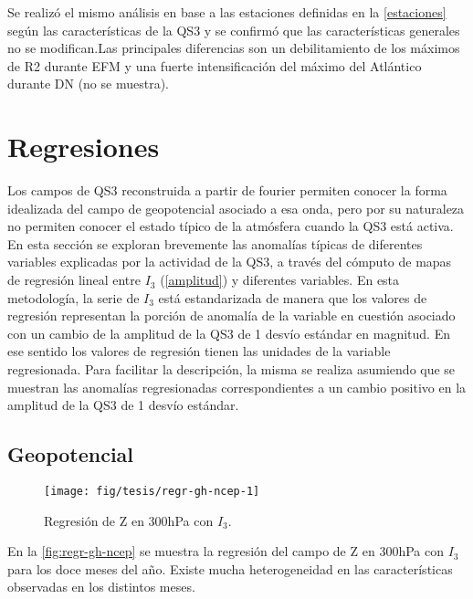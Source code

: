 \documentclass[spanish,a4paper,12p]{book}
\begin{document}
Se realizó el mismo análisis en base a las estaciones definidas en la
\autoref{estaciones} según las características de la QS3 y se confirmó
que las características generales no se modifican.Las principales
diferencias son un debilitamiento de los máximos de R2 durante EFM y una
fuerte intensificación del máximo del Atlántico durante DN (no se
muestra).

\section{Regresiones}\label{regresiones}

Los campos de QS3 reconstruida a partir de fourier permiten conocer la
forma idealizada del campo de geopotencial asociado a esa onda, pero por
su naturaleza no permiten conocer el estado típico de la atmósfera
cuando la QS3 está activa. En esta sección se exploran brevemente las
anomalías típicas de diferentes variables explicadas por la actividad de
la QS3, a través del cómputo de mapas de regresión lineal entre \(I_3\)
(\autoref{amplitud}) y diferentes variables. En esta metodología, la
serie de \(I_3\) está estandarizada de manera que los valores de
regresión representan la porción de anomalía de la variable en cuestión
asociado con un cambio de la amplitud de la QS3 de 1 desvío estándar en
magnitud. En ese sentido los valores de regresión tienen las unidades de
la variable regresionada. Para facilitar la descripción, la misma se
realiza asumiendo que se muestran las anomalías regresionadas
correspondientes a un cambio positivo en la amplitud de la QS3 de 1
desvío estándar.

\subsection{Geopotencial}\label{geopotencial}

\begin{landscape}\begin{figure}

{\centering \texttt{[image: fig/tesis/regr-gh-ncep-1]} 

}

\caption{Regresión de Z en 300hPa con $I_3$.}\label{fig:regr-gh-ncep}
\end{figure}
\end{landscape}

En la \autoref{fig:regr-gh-ncep} se muestra la regresión del campo de Z
en 300hPa con \(I_3\) para los doce meses del año. Existe mucha
heterogeneidad en las características observadas en los distintos meses.
\end{document}
